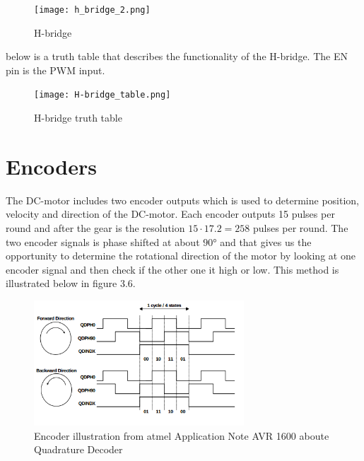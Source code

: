   \begin{figure}[!h!]
	\centering
	\texttt{[image: h\_bridge\_2.png]}
	\caption{H-bridge}
	\label{fig:3}
\end{figure}

 below is a truth table that describes the functionality of the H-bridge. The EN pin is the PWM input.  

  \begin{figure}[!h!]
	\centering
	\texttt{[image: H-bridge\_table.png]}
	\caption{H-bridge truth table}
	\label{fig:intro_4}
\end{figure}

\newpage
\section{Encoders}
  The DC-motor includes two encoder outputs which is used to determine position, velocity and direction of the DC-motor.
  Each encoder outputs 15 pulses per round and after the gear is the resolution $15 \cdot 17.2 = 258$ pulses per round.
  The two encoder signals is phase shifted at about $\ang{90}$ and that gives us the opportunity to determine the rotational direction of the motor by looking at one encoder signal and then check if the other one it high or low. This method is illustrated below in figure 3.6.
   
  \begin{figure}[!h!]
	\centering
	\includegraphics[width=0.7\textwidth]{resources/encoder_atmel.png}
	\caption{Encoder illustration from atmel Application Note AVR 1600 aboute Quadrature Decoder}
	\label{fig:5}
\end{figure}

